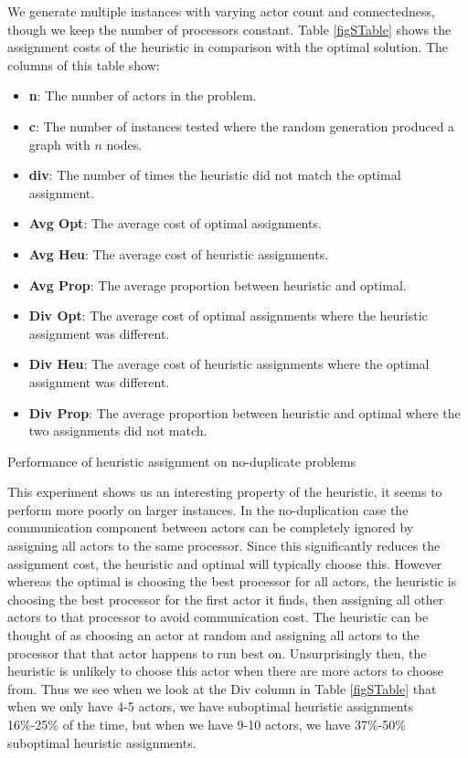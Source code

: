 We generate multiple instances with varying actor count and connectedness, though we keep the number of processors constant.
Table \ref{figSTable} shows the assignment costs of the heuristic in comparison with the optimal solution.
The columns of this table show:
\begin{itemize}
	\item {\bf n}: The number of actors in the problem.
	\item {\bf c}: The number of instances tested where the random generation produced a graph with $n$ nodes.
	\item {\bf div}: The number of times the heuristic did not match the optimal assignment.
	\item {\bf Avg Opt}: The average cost of optimal assignments.
	\item {\bf Avg Heu}: The average cost of heuristic assignments.
	\item {\bf Avg Prop}: The average proportion between heuristic and optimal.
	\item {\bf Div Opt}: The average cost of optimal assignments where the heuristic assignment was different.
	\item {\bf Div Heu}: The average cost of heuristic assignments where the optimal assignment was different.
	\item {\bf Div Prop}: The average proportion between heuristic and optimal where the two assignments did not match.
\end{itemize}

\begin{table}
\begin{center}
	
\caption{Performance of heuristic assignment on no-duplicate problems}
\label{figSTable}
\end{center}
\end{table}

This experiment shows us an interesting property of the heuristic, it seems to perform more poorly on larger instances.
In the no-duplication case the communication component between actors can be completely ignored by assigning all actors to the same processor.
Since this significantly reduces the assignment cost, the heuristic and optimal will typically choose this.
However whereas the optimal is choosing the best processor for all actors, the heuristic is choosing the best processor for the first actor it finds, then assigning all other actors to that processor to avoid communication cost.
The heuristic can be thought of as choosing an actor at random and assigning all actors to the processor that that actor happens to run best on.
Unsurprisingly then, the heuristic is unlikely to choose this actor when there are more actors to choose from.
Thus we see when we look at the Div column in Table \ref{figSTable} that when we only have 4-5 actors, we have suboptimal heuristic assignments 16\%-25\% of the time, but when we have 9-10 actors, we have 37\%-50\% suboptimal heuristic assignments.

